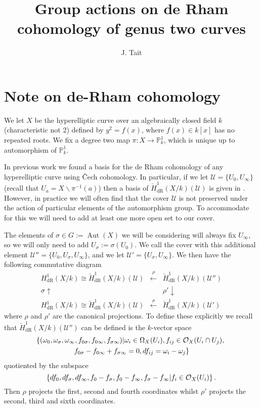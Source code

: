 \documentclass[draft, 11pt]{article} %
\title{Group actions on de Rham cohomology of genus two curves}
\author{J. Tait}
\theoremstyle{plain}
\theoremstyle{remark}
\newcommand{\cO}{{\cal O}}
\newcommand{\ra}{\rightarrow}
\newcommand{\cU}{{\mathcal U}}
\newcommand{\cech}{\v{C}ech }
\newcommand{\derhamhone}{H_{\text {dR}}^1(X/k)}
\newcommand{\cechderhamhone}{\check{H}_{\text {dR}}^1(X/k)}
\DeclareMathOperator{\aut}{Aut}
\begin{document}
\maketitle
\listoftodos
\bigskip

\section{Note on de-Rham cohomology}
We let $X$ be the hyperelliptic curve over an algebraically closed field $k$ (characteristic not 2) defined by $y^2 = f(x)$, where $f(x) \in k[x]$ has no repeated roots.
We fix a degree two map $\pi \colon X \ra \mathbb P^1_k$, which is unique up to automorphism of $\mathbb P_k^1$.



In previous work we found a basis for the de Rham cohomology of any hyperelliptic curve using \cech cohomology.
In particular,  if we let $\cU = \{ U_0 , U_\infty\}$ (recall that $U_a = X\backslash \pi^{-1}(a)$) then a basis of $\cechderhamhone(\cU)$ is given in \cite{derhamactions}.
However, in practice we will often find that the cover $\cU$ is not preserved under the action of particular elements of the automorphism group.
To accommodate for this we will need to add at least one more open set to our cover.


The elements of $\sigma \in G := \aut(X)$ we will be considering will always fix $U_\infty$, so we will only need to add $U_\sigma := \sigma(U_0)$.
We call the cover with this additional element $\cU'' = \{U_0, U_\sigma, U_\infty \}$, and we let $\cU' = \{U_\sigma, U_\infty\}$.
We then have the following commutative diagram
\[
\begin{array}{ccc}
\derhamhone \cong \cechderhamhone(\cU)  & \xleftarrow{\rho} & \cechderhamhone(\cU'')  \\
\sigma\uparrow & ~ & \rho'\downarrow  \\
\derhamhone \cong \cechderhamhone(\cU)  & \xleftarrow{\sigma} & \cechderhamhone(\cU')
\end{array}
\]
where $\rho$ and $\rho'$ are the canonical projections.
To define these explicitly we recall that $\cechderhamhone(\cU'')$ can be defined is the $k$-vector space 
\begin{multline}\label{sixtupleconditions}
\left\{ (\omega_0, \omega_\sigma, \omega_\infty , f_{0\sigma}, f_{0 \infty},f_{\sigma \infty}) | \omega_i \in \Omega_X(U_i), f_{ij} \in \cO_X(U_i \cap U_j), \right. \\ \left. f_{0\sigma} - f_{0\infty} + f_{\sigma \infty} = 0, df_{ij} = \omega_i - \omega_j \right\}
\end{multline}
quotiented by the subspace 
\[
\left\{ df_0, df_\sigma, df_\infty, f_0- f_\sigma, f_0 - f_\infty, f_\sigma - f_\infty | f_i \in \cO_X(U_i)\right\}.
\]
Then $\rho$ projects the first, second and fourth coordinates whilst $\rho'$ projects the second, third and sixth coordinates.
\end{document}
